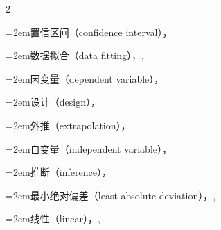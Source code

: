 \begin{multicols}{2}
\par\noindent\hangindent=2em\hspace*{1em}\label{idx:887}置信区间（confidence interval），\hyperref[eq:11.3.37]{\pageref*{eq:11.3.37}}\par
\par\noindent\hangindent=2em\hspace*{1em}\label{idx:888}数据拟合（data fitting），\hyperref[idxocc:888:468]{\pageref*{idxocc:888:468}}, \hyperref[idxocc:888:471]{\pageref*{idxocc:888:471}}\par
\par\noindent\hangindent=2em\hspace*{1em}\label{idx:889}因变量（dependent variable），\hyperref[idxocc:889:466]{\pageref*{idxocc:889:466}}\par
{}
\par\noindent\hangindent=2em\hspace*{1em}\label{idx:890}设计（design），\hyperref[idxocc:890:473]{\pageref*{idxocc:890:473}}\par
\par\noindent\hangindent=2em\hspace*{1em}\label{idx:891}外推（extrapolation），\hyperref[idxocc:891:486]{\pageref*{idxocc:891:486}}\par
\par\noindent\hangindent=2em\hspace*{1em}\label{idx:892}自变量（independent variable），\hyperref[idxocc:892:466]{\pageref*{idxocc:892:466}}\par
\par\noindent\hangindent=2em\hspace*{1em}\label{idx:893}推断（inference），\hyperref[idxocc:893:468]{\pageref*{idxocc:893:468}}\par
\par\noindent\hangindent=2em\hspace*{1em}\label{idx:894}最小绝对偏差（least absolute deviation），\hyperref[idxocc:894:514]{\pageref*{idxocc:894:514}}, \hyperref[exercise:12.25]{\pageref*{exercise:12.25}}\par
\par\noindent\hangindent=2em\hspace*{1em}\label{idx:895}线性（linear），\hyperref[idxocc:895:467]{\pageref*{idxocc:895:467}}, \hyperref[sec:11.3.3]{\pageref*{sec:11.3.3}}\par

\end{multicols}
